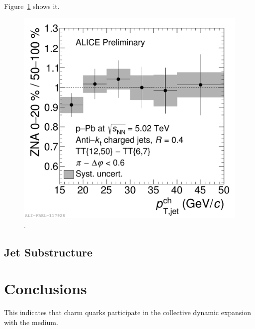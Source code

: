 \documentclass[10pt]{article}
\def\Acknowledgements{\bigskip  \bigskip \begin{center} \begin{large}
             \bf ACKNOWLEDGEMENTS \end{large}\end{center}}
\begin{document}
Figure~\ref{fig:rppbhjet} shows it.
\begin{figure}[tb]
\centering
\includegraphics[width=.5\textwidth]{img/2017-Feb-01-ppb5_RCP_pap_AKT04_ZNA_split2}
\caption{.}
\label{fig:rppbhjet}
\end{figure}

\subsection{Jet Substructure}

\section{Conclusions}
This indicates
that charm quarks participate in the collective dynamic expansion with the medium.
 




{}

 
\end{document}
